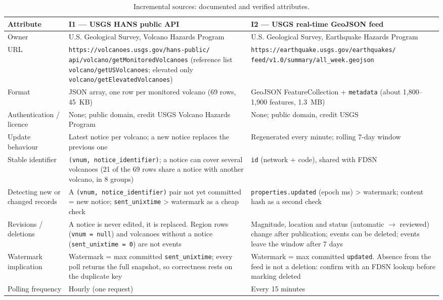 \documentclass[11pt,a4paper]{article}
\begin{document}
\begin{table}[h]
\centering
\footnotesize
\setlength{\tabcolsep}{4pt}
\caption{Incremental sources: documented and verified attributes.}
\label{tab:incr}
\begin{tabular}{@{}L{2.8cm}L{6.1cm}L{6.0cm}@{}}
\toprule
\textbf{Attribute} & \textbf{I1 --- USGS HANS public API} &
\textbf{I2 --- USGS real-time GeoJSON feed} \\
\midrule
Owner & U.S. Geological Survey, Volcano Hazards Program &
U.S. Geological Survey, Earthquake Hazards Program \\
\addlinespace
URL & \texttt{https://volcanoes.usgs.gov/hans-public/} \texttt{api/volcano/getMonitoredVolcanoes}
(reference list \texttt{volcano/getUSVolcanoes}; elevated only
\texttt{volcano/getElevatedVolcanoes}) &
\texttt{https://earthquake.usgs.gov/earthquakes/} \texttt{feed/v1.0/summary/all\_week.geojson} \\
\addlinespace
Format & JSON array, one row per monitored volcano (69 rows, 45~KB) &
GeoJSON FeatureCollection + \texttt{metadata} (about 1{,}800--1{,}900 features,
1.3~MB) \\
\addlinespace
Authentication / licence & None; public domain, credit USGS Volcano Hazards Program &
None; public domain, credit USGS \\
\addlinespace
Update behaviour & Latest notice per volcano; a new notice replaces the previous one &
Regenerated every minute; rolling 7-day window \\
\addlinespace
Stable identifier & \texttt{(vnum, notice\_identifier)}; a notice can cover several
volcanoes (21 of the 69 rows share a notice with another volcano, in 8 groups) &
\texttt{id} (network + code), shared with FDSN \\
\addlinespace
Detecting new or changed records & A \texttt{(vnum, notice\_identifier)} pair not yet
committed = new notice; \texttt{sent\_unixtime} > watermark as a cheap check &
\texttt{properties.updated} (epoch ms) > watermark; content hash as a second check \\
\addlinespace
Revisions / deletions & A notice is never edited, it is replaced. Region rows
(\texttt{vnum = null}) and volcanoes without a notice
(\texttt{sent\_unixtime = 0}) are not events &
Magnitude, location and status (automatic $\rightarrow$ reviewed) change after
publication; events can be deleted; events leave the window after 7 days \\
\addlinespace
Watermark implication & Watermark = max committed \texttt{sent\_unixtime}; every poll
returns the full snapshot, so correctness rests on the duplicate key &
Watermark = max committed \texttt{updated}. Absence from the feed is not a deletion:
confirm with an FDSN lookup before marking deleted \\
\addlinespace
Polling frequency & Hourly (one request) & Every 15 minutes \\
\bottomrule
\end{tabular}
\end{table}
\end{document}
